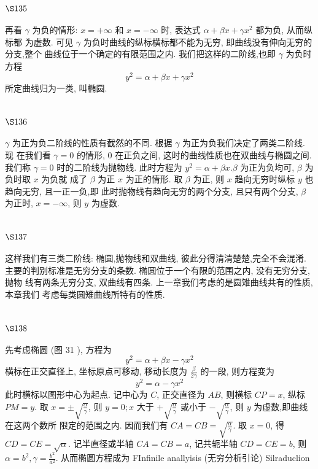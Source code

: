 \section{$\S 135$}

再看 $\gamma$ 为负的情形: $x=+\infty$ 和 $x=-\infty$ 时, 表达式 $\alpha+\beta x+\gamma x^{2}$ 都为负, 从而纵标都 为虚数. 可见 $\gamma$ 为负时曲线的纵标横标都不能为无穷, 即曲线没有伸向无穷的分支,整个 曲线位于一个确定的有限范围之内. 我们把这样的二阶线,也即 $\gamma$ 为负时方程
\[
y^{2}=\alpha+\beta x+\gamma x^{2}
\]
所定曲线归为一类, 叫椭圆.

\section{$\S 136$}

$\gamma$ 为正为负二阶线的性质有截然的不同. 根据 $\gamma$ 为正为负我们决定了两类二阶线. 现 在我们看 $\gamma=0$ 的情形, 0 在正负之间, 这时的曲线性质也在双曲线与椭圆之间. 我们称 $\gamma=0$ 时的二阶线为抛物线. 此时方程为 $y^{2}=\alpha+\beta x . \beta$ 为正为负均可, $\beta$ 为负时取 $x$ 为负就 成了 $\beta$ 为正 $x$ 为正的情形. 取 $\beta$ 为正, 则 $x$ 趋向无穷时纵标 $y$ 也趋向无穷, 且一正一负,即 此时抛物线有趋向无穷的两个分支, 且只有两个分支, $\beta$ 为正时, $x=-\infty$, 则 $y$ 为虚数.

\section{$\S 137$}

这样我们有三类二阶线: 椭圆,抛物线和双曲线, 彼此分得清清楚楚,完全不会混淆. 主要的判别标准是无穷分支的条数. 椭圆位于一个有限的范围之内, 没有无穷分支, 抛物 线有两条无穷分支, 双曲线有四条. 上一章我们考虑的是圆雉曲线共有的性质, 本章我们 考虑每类圆雉曲线所特有的性质.

\section{$\S 138$}

先考虑椭圆 (图 31 ), 方程为
\[
y^{2}=\alpha+\beta x-\gamma x^{2}
\]
横标在正交直径上, 坐标原点可移动, 移动长度为 $\frac{\beta}{2 \gamma}$ 的一段, 则方程变为
\[
y^{2}=\alpha-\gamma x^{2}
\]
此时横标以图形中心为起点. 记中心为 $C$, 正交直径为 $A B$, 则横标 $C P=x$, 纵标 $P M=y$. 取 $x=\pm \sqrt{\frac{\alpha}{\gamma}}$, 则 $y=0 ; x$ 大于 $+\sqrt{\frac{\alpha}{\gamma}}$ 或小于 $-\sqrt{\frac{\alpha}{\gamma}}$, 则 $y$ 为虚数,即曲线在这两个数所 限定的范围之内. 因而我们有 $C A=C B=\sqrt{\frac{\alpha}{\gamma}}$. 取 $x=0$, 得 $C D=C E=\sqrt{\alpha}$. 记半直径或半轴 $C A=C B=a$, 记共轭半轴 $C D=C E=b$, 则 $\alpha=b^{2}, \gamma=\frac{b^{2}}{a^{2}}$. 从而椭圆方程成为 FInfinile anallyisis (无穷分析引论) Silraduclion


